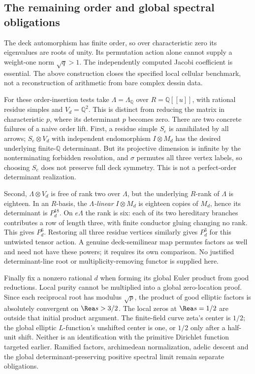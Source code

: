 \documentclass[11pt]{article}
\theoremstyle{definition}\newtheorem{definition}[theorem]{Definition}
\theoremstyle{remark}\newtheorem{remark}[theorem]{Remark}
\begin{document}
\subsection{The remaining order and global spectral obligations}
The deck automorphism has finite order, so over characteristic zero its eigenvalues are roots of unity. Its permutation action alone cannot supply a weight-one norm $\sqrt q>1$. The independently computed Jacobi coefficient is essential. The above construction closes the specified local cellular benchmark, not a reconstruction of arithmetic from bare complex dessin data.

For these order-insertion tests take $\Lambda=\Lambda_{\mathbb{Q}}$ over $R=\mathbb{Q}[[u]]$, with rational residue simples and $V_d=\mathbb{Q}^2$. This is distinct from reducing the matrix in characteristic $p$, where its determinant $p$ becomes zero. There are two concrete failures of a naive order lift. First, a residue simple $S_e$ is annihilated by all arrows; $S_e\otimes V_d$ with independent endomorphism $I\otimes M_d$ has the desired underlying finite-$\mathbb{Q}$ determinant. But its projective dimension is infinite by the nonterminating forbidden resolution, and $\sigma$ permutes all three vertex labels, so choosing $S_e$ does not preserve full deck symmetry. This is not a perfect-order determinant realization.

Second, $\Lambda\otimes V_d$ is free of rank two over $\Lambda$, but the underlying $R$-rank of $\Lambda$ is eighteen. In an $R$-basis, the \emph{$\Lambda$-linear} $I\otimes M_d$ is eighteen copies of $M_d$, hence its determinant is $P_d^{18}$. On $e\Lambda$ the rank is six: each of its two hereditary branches contributes a row of length three, with finite conductor gluing changing no rank. This gives $P_d^6$. Restoring all three residue vertices similarly gives $P_d^3$ for this untwisted tensor action. A genuine deck-semilinear map permutes factors as well and need not have these powers; it requires its own comparison. No justified determinant-line root or multiplicity-removing functor is supplied here.

Finally fix a nonzero rational $d$ when forming its global Euler product from good reductions. Local purity cannot be multiplied into a global zero-location proof. Since each reciprocal root has modulus $\sqrt p$, the product of good elliptic factors is absolutely convergent on $\Rea s>3/2$. The local zeros at $\Rea s=1/2$ are outside that initial product argument. The finite-field curve zeta's center is $1/2$; the global elliptic $L$-function's unshifted center is one, or $1/2$ only after a half-unit shift. Neither is an identification with the primitive Dirichlet function targeted earlier. Ramified factors, archimedean normalization, adelic descent and the global determinant-preserving positive spectral limit remain separate obligations.
\end{document}
